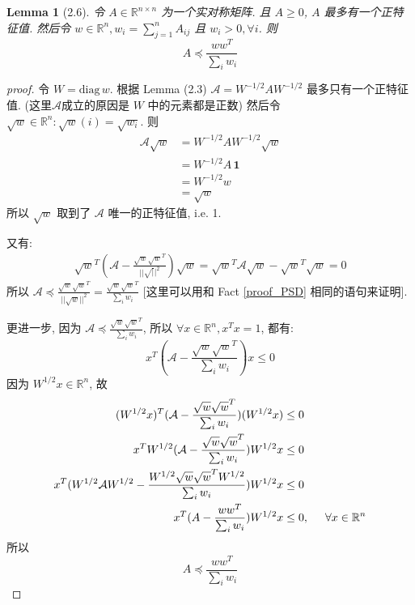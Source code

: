 \documentclass{article}
\newtheorem*{lemma*}{Lemma}
\def\diag{\mathrm{diag}}
\begin{document}
\begin{lemma*}[2.6]
  令 $A \in \mathbb{R}^{n\times n}$ 为一个实对称矩阵.
  且 $A \geq 0$, $A$  最多有一个正特征值.
  然后令 $w \in \mathbb{R}^n, w_i = \sum_{j=1}^n A_{ij}$ 且 $w_i > 0, \forall i$.
  则
  \[A \preccurlyeq \frac{ww^T}{\sum_i w_i}\]
\end{lemma*}
\begin{proof}[proof]
  令 $W = \diag\,w$.
  根据 Lemma (2.3) $\mathcal{A} = W^{-1/2}AW^{-1/2}$ 最多只有一个正特征值.
  (这里$\mathcal{A}$成立的原因是 $W$ 中的元素都是正数)
  然后令 $\sqrt{w} \in \mathbb{R}^n: \sqrt{w}(i) = \sqrt{w_i}$.
  则
  \begin{align*}
    \mathcal{A}\sqrt{w} &= W^{-1/2}AW^{-1/2}\sqrt{w} \\
                        &= W^{-1/2}A\,\mathbf{1} \\
                        &= W^{-1/2}w \\
                        &= \sqrt{w}
  \end{align*}
  所以 $\sqrt{w}$ 取到了 $\mathcal{A}$ 唯一的正特征值, i.e. 1.

  又有:
  \begin{align*}
    \sqrt{w}^T(\mathcal{A} - \frac{\sqrt{w}\sqrt{w}^T}{||\sqrt||^2})\sqrt{w} = \sqrt{w}^T\mathcal{A}\sqrt{w} - \sqrt{w}^T\sqrt{w} = 0
  \end{align*}
  所以 $\mathcal{A} \preccurlyeq \frac{\sqrt{w}\sqrt{w}^T}{||\sqrt{w}||^2} = \frac{\sqrt{w}\sqrt{w}^T}{\sum_i w_i}$ [这里可以用和 Fact \ref{proof_PSD} 相同的语句来证明].

  更进一步, 因为 $\mathcal{A}\preccurlyeq \frac{\sqrt{w}\sqrt{w}^T}{\sum_i w_i}$, 所以 $\forall x\in\mathbb{R}^n, x^Tx = 1$, 都有:
    \[x^T(\mathcal{A} - \frac{\sqrt{w}\sqrt{w}^T}{\sum_i w_i})x \leq 0\]
    因为 $W^{1/2}x \in \mathbb{R}^n$, 故
    \begin{align*}
      (W^{1/2}x)^T(\mathcal{A} - \frac{\sqrt{w}\sqrt{w}^T}{\sum_i w_i})(W^{1/2}x) &\leq 0 \\
      x^TW^{1/2}(\mathcal{A} - \frac{\sqrt{w}\sqrt{w}^T}{\sum_i w_i})W^{1/2}x &\leq 0 \\
      x^T(W^{1/2}\mathcal{A}W^{1/2} - \frac{W^{1/2}\sqrt{w}\sqrt{w}^TW^{1/2}}{\sum_i w_i})W^{1/2}x &\leq 0 \\
      x^T(A - \frac{ww^T}{\sum_i w_i})W^{1/2}x &\leq 0, \hspace{0.5cm} \forall x\in\mathbb{R}^n
    \end{align*}
    所以
    \[A\preccurlyeq \frac{ww^T}{\sum_i w_i}\]
\end{proof}
\end{document}
